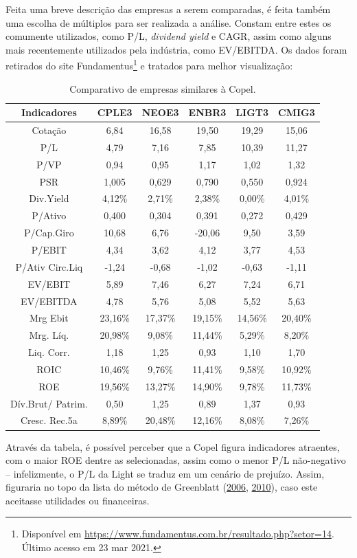 \documentclass[grad,numbers]{coppe}
\begin{document}
  Feita uma breve descrição das empresas a serem comparadas, é feita também uma escolha de múltiplos para ser realizada a análise. Constam entre estes os comumente utilizados, como P/L, \emph{dividend yield} e CAGR, assim como alguns mais recentemente utilizados pela indústria, como EV/EBITDA. Os dados foram retirados do site Fundamentus\footnote{Disponível em \url{https://www.fundamentus.com.br/resultado.php?setor=14}. Último acesso em 23 mar 2021.} e tratados para melhor visualização:
  \begin{table}[H]

  \caption{\label{tab:unnamed-chunk-20}Comparativo de empresas similares à Copel.}
  \centering
  \begin{tabular}[t]{cccccc}
  \toprule
  Indicadores & CPLE3 & NEOE3 & ENBR3 & LIGT3 & CMIG3\\
  \midrule
  Cotação & 6,84 & 16,58 & 19,50 & 19,29 & 15,06\\
  P/L & 4,79 & 7,16 & 7,85 & 10,39 & 11,27\\
  P/VP & 0,94 & 0,95 & 1,17 & 1,02 & 1,32\\
  PSR & 1,005 & 0,629 & 0,790 & 0,550 & 0,924\\
  Div.Yield & 4,12\% & 2,71\% & 2,38\% & 0,00\% & 4,01\%\\
  \addlinespace
  P/Ativo & 0,400 & 0,304 & 0,391 & 0,272 & 0,429\\
  P/Cap.Giro & 10,68 & 6,76 & -20,06 & 9,50 & 3,59\\
  P/EBIT & 4,34 & 3,62 & 4,12 & 3,77 & 4,53\\
  P/Ativ Circ.Liq & -1,24 & -0,68 & -1,02 & -0,63 & -1,11\\
  EV/EBIT & 5,89 & 7,46 & 6,27 & 7,24 & 6,71\\
  \addlinespace
  EV/EBITDA & 4,78 & 5,76 & 5,08 & 5,52 & 5,63\\
  Mrg Ebit & 23,16\% & 17,37\% & 19,15\% & 14,56\% & 20,40\%\\
  Mrg. Líq. & 20,98\% & 9,08\% & 11,44\% & 5,29\% & 8,20\%\\
  Liq. Corr. & 1,18 & 1,25 & 0,93 & 1,10 & 1,70\\
  ROIC & 10,46\% & 9,76\% & 11,41\% & 9,58\% & 10,92\%\\
  \addlinespace
  ROE & 19,56\% & 13,27\% & 14,90\% & 9,78\% & 11,73\%\\
  Dív.Brut/ Patrim. & 0,50 & 1,25 & 0,89 & 1,37 & 0,93\\
  Cresc. Rec.5a & 8,89\% & 20,48\% & 12,16\% & 8,08\% & 7,26\%\\
  \bottomrule
  \end{tabular}
  \end{table}
  Através da tabela, é possível perceber que a Copel figura indicadores atraentes, com o maior ROE dentre as selecionadas, assim como o menor P/L não-negativo -- infelizmente, o P/L da Light se traduz em um cenário de prejuízo. Assim, figuraria no topo da lista do método de Greenblatt (\protect\hyperlink{ref-greenblatt2006}{2006}, \protect\hyperlink{ref-greenblatt2010}{2010}), caso este aceitasse utilidades ou financeiras.
\end{document}
